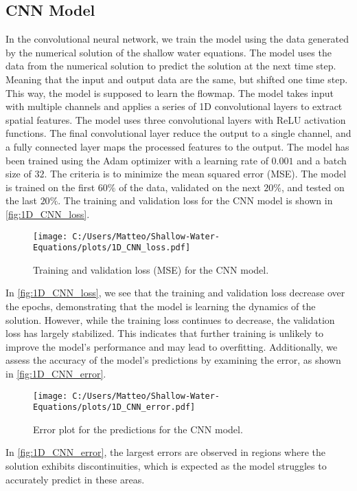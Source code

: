 \subsection*{CNN Model}
In the convolutional neural network, we train the model using the data generated by the numerical solution of the shallow water equations.
The model uses the data from the numerical solution to predict the solution at the next time step.
Meaning that the input and output data are the same, but shifted one time step. This way, the model is supposed to learn the flowmap.
The model takes input with multiple channels and applies a series of 1D convolutional layers to extract spatial features.
The model uses three convolutional layers with ReLU activation functions.
The final convolutional layer reduce the output to a single channel, and a fully connected layer maps the processed features to the output.
The model has been trained using the Adam optimizer with a learning rate of $0.001$ and a batch size of $32$.
The criteria is to minimize the mean squared error (MSE).
The model is trained on the first $60\%$ of the data, validated on the next $20\%$, and tested on the last $20\%$.
The training and validation loss for the CNN model is shown in \autoref{fig:1D_CNN_loss}.
\begin{figure}[H]
    \centering
    \texttt{[image: C:/Users/Matteo/Shallow-Water-Equations/plots/1D\_CNN\_loss.pdf]}
    \caption{Training and validation loss (MSE) for the CNN model.}\label{fig:1D_CNN_loss}
\end{figure}
In \autoref{fig:1D_CNN_loss}, we see that the training and validation loss decrease over the epochs, demonstrating that the model is learning the dynamics of the solution.
However, while the training loss continues to decrease, the validation loss has largely stabilized.
This indicates that further training is unlikely to improve the model's performance and may lead to overfitting.
Additionally, we assess the accuracy of the model's predictions by examining the error, as shown in \autoref{fig:1D_CNN_error}.
\begin{figure}[H]
    \centering
    \texttt{[image: C:/Users/Matteo/Shallow-Water-Equations/plots/1D\_CNN\_error.pdf]}
    \caption{Error plot for the predictions for the CNN model.}\label{fig:1D_CNN_error}
\end{figure}
In \autoref{fig:1D_CNN_error}, the largest errors are observed in regions where the solution exhibits discontinuities, which is expected as the model struggles to accurately predict in these areas.
